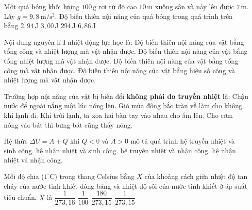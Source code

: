 \begin{ex}
Một quả bóng khối lượng $100\,\mathrm{g}$ rơi từ độ cao $10\,\mathrm{m}$ xuống sân và nảy lên được $7\,\mathrm{m}$. Lấy $g=9{,}8\,\mathrm{m/s^2}$. Độ biến thiên nội năng của quả bóng trong quá trình trên bằng
\choice
{\True $2{,}94\,\mathrm{J}$}
{$3{,}00\,\mathrm{J}$}
{$294\,\mathrm{J}$}
{$6{,}86\,\mathrm{J}$}
\end{ex}


\begin{ex}
Nội dung nguyên lí I nhiệt động lực học là:
\choice
{\True Độ biến thiên nội năng của vật bằng tổng công và nhiệt lượng mà vật nhận được.}
{Độ biến thiên nội năng của vật bằng tổng nhiệt lượng mà vật nhận được.}
{Độ biến thiên nội năng của vật bằng tổng công mà vật nhận được.}
{Độ biến thiên nội năng của vật bằng hiệu số công và nhiệt lượng mà vật nhận được.}
\end{ex}

\begin{ex}
Trường hợp nội năng của vật bị biến đổi \textbf{không phải do truyền nhiệt} là:
\choice
{Chậu nước để ngoài nắng một lúc nóng lên.}
{Gió mùa đông bắc tràn về làm cho không khí lạnh đi.}
{\True Khi trời lạnh, ta xoa hai bàn tay vào nhau cho ấm lên.}
{Cho cơm nóng vào bát thì bưng bát cũng thấy nóng.}
\end{ex}

\begin{ex}
Hệ thức $\Delta U=A+Q$ khi $Q<0$ và $A>0$ mô tả quá trình
\choice
{hệ truyền nhiệt và sinh công.}
{hệ nhận nhiệt và sinh công.}
{\True hệ truyền nhiệt và nhận công.}
{hệ nhận nhiệt và nhận công.}
\end{ex}

\begin{ex}
Mỗi độ chia ($1^\circ\mathrm{C}$) trong thang Celsius bằng $X$ của khoảng cách giữa nhiệt độ tan chảy của nước tinh khiết đóng băng và nhiệt độ sôi của nước tinh khiết ở áp suất tiêu chuẩn. $X$ là
\choice
{$\dfrac{1}{273{,}16}$}
{\True $\dfrac{1}{100}$}
{$\dfrac{180}{273{,}15}$}
{$\dfrac{1}{273{,}15}$}
\end{ex}

